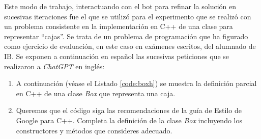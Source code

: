 \documentclass[twocolumn,twoside,a4paper, 10pt]{article}
\newcommand{\ChatGPT}{\textit{ChatGPT}{}}           %
\begin{document}

Este modo de trabajo, interactuando con el bot para refinar la solución en sucesivas iteraciones fue el que se
utilizó para el experimento que se realizó con un problema consistente en la implementación en C++ de una
clase para representar ``cajas''. 
Se trata de un problema de programación que ha figurado como ejercicio de evaluación, en este caso
en exámenes escritos, del alumnado de IB.
Se exponen a continuación en español las sucesivas peticiones que se realizaron a \ChatGPT{} en inglés:
\begin{enumerate}
  \item A continuación (véase el Listado \ref{code:boxh}) se muestra la definición parcial en C++ de una clase \textit{Box}
    que representa una caja.
  \item Queremos que el código siga las recomendaciones de la guía de Estilo de Google para C++.
        Completa la definición de la clase \textit{Box} incluyendo los constructores y métodos que consideres
        adecuado.


\end{enumerate}
\end{document}
